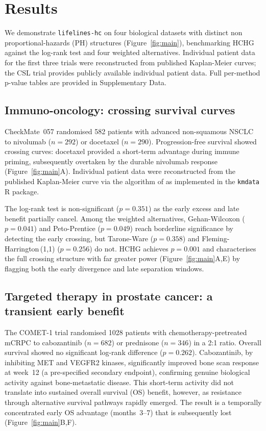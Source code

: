 \documentclass[unnumsec,webpdf,contemporary,large]{oup-authoring-template}
\begin{document}
\section{Results}

We demonstrate \texttt{lifelines-hc} on four biological datasets with
distinct non proportional-hazards (PH) structures (Figure~\ref{fig:main}), benchmarking HCHG
against the log-rank test and four weighted alternatives.
Individual patient data for the first three trials were reconstructed from
published Kaplan-Meier curves; the CSL trial provides publicly available individual patient data.
Full per-method p-value tables are provided in Supplementary Data.

\subsection*{Immuno-oncology: crossing survival curves}

CheckMate~057 \citep{borghaei2015} randomised 582 patients with advanced
non-squamous NSCLC to nivolumab ($n=292$) or docetaxel ($n=290$).
Progression-free survival showed crossing curves: docetaxel provided a
short-term advantage during immune priming, subsequently overtaken by the
durable nivolumab response (Figure~\ref{fig:main}A). Individual patient
data were reconstructed from the published Kaplan-Meier curve via the
algorithm of \citet{guyot2012} as implemented in the \texttt{kmdata}
R package.

The log-rank test is non-significant ($p = 0.351$) as the early excess
and late benefit partially cancel. Among the weighted alternatives,
Gehan-Wilcoxon ($p = 0.041$) and Peto-Prentice ($p = 0.049$) reach
borderline significance by detecting the early crossing, but
Tarone-Ware ($p = 0.358$) and Fleming-Harrington\,(1,1) ($p = 0.256$)
do not. HCHG achieves $p = 0.001$ and characterises the full crossing
structure with far greater power (Figure~\ref{fig:main}A,E) by flagging
both the early divergence and late separation windows.

\subsection*{Targeted therapy in prostate cancer: a transient early benefit}

The COMET-1 trial \citep{smith2016} randomised 1028 patients with
chemotherapy-pretreated mCRPC to cabozantinib ($n=682$) or prednisone
($n=346$) in a 2:1 ratio. Overall survival showed no significant
log-rank difference ($p = 0.262$). Cabozantinib, by inhibiting
MET and VEGFR2 kinases, significantly improved bone scan response at
week~12 (a pre-specified secondary endpoint), confirming genuine
biological activity against bone-metastatic disease.
This short-term activity did not translate into sustained overall survival (OS) benefit,
however, as resistance through alternative survival pathways rapidly
emerged. The result is a temporally concentrated early OS advantage
(months~3--7) that is subsequently lost (Figure~\ref{fig:main}B,F).
\end{document}
